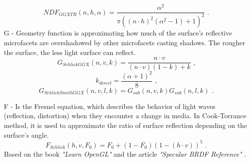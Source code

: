\begin{equation}
NDF_{GGXTR}(n, h, \alpha) = \frac{\alpha^2}{\pi((n \cdot h)^2(\alpha^2 - 1) + 1)^2}
\text{ .}
\end{equation}
G - Geometry function is approximating how much of the surface's reflective microfacets are overshadowed by other microfacets casting shadows. The rougher the surface, the less light surface can reflect.
\begin{equation}
G_{SchlickGGX}(n, v, k) = \frac{n \cdot v}{(n \cdot v)(1 - k) + k}
\text{ ,}
\end{equation}
\begin{equation}
k_{direct} = \frac{(\alpha + 1)^2}{8}
\text{ ,}
\end{equation}
\begin{equation}
G_{SchlickSmithGGX}(n, v, l, k) = G_{sub}(n, v, k) G_{sub}(n, l, k)
\text{ .}
\end{equation}

F - Is the Fresnel equation, which describes the behavior of light waves (reflection, distortion) when they encounter a change in media. In Cook-Torrance method, it is used to approximate the ratio of surface reflection depending on the surface's angle.\\ 
\begin{equation}
F_{Schlick}(h, v, F_0) = F_0 + (1 - F_0)(1 - (h \cdot v))^5
\text{ .}
\end{equation}
Based on the book \textit{"Learn OpenGL"} \cite{learnopengl} and the article \textit{"Specular BRDF Reference"} \cite{pbrreferences}.